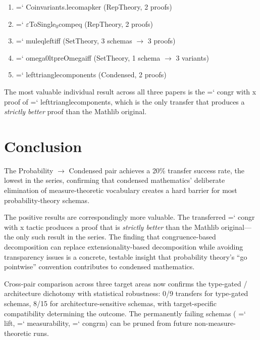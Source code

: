 \documentclass[11pt]{article}
\renewcommand{\texttt}[1]{%
  \begingroup\ttfamily\hyphenchar\font=`\-\relax
  \def\_{\textunderscore\discretionary{}{}{}}%
  #1\endgroup}
\theoremstyle{definition}
\theoremstyle{remark}
\begin{document}
\begin{enumerate}
\item \texttt{Coinvariants.le\_comap\_ker} (RepTheory, 2 proofs)
\item \texttt{$\varepsilon$ToSingle$_0$\_comp\_eq} (RepTheory, 2 proofs)
\item \texttt{mul\_eq\_left\_iff} (SetTheory, 3 schemas $\to$ 3 proofs)
\item \texttt{omega0\_lt\_preOmega\_iff} (SetTheory, 1 schema $\to$ 3 variants)
\item \texttt{left\_triangle\_components} (Condensed, 2 proofs)
\end{enumerate}

The most valuable individual result across all three papers is
the \texttt{congr with x} proof of
\texttt{left\_triangle\_components}, which is the only transfer
that produces a \emph{strictly better} proof than the Mathlib
original.

\section{Conclusion}\label{sec:conclusion}

The Probability $\to$ Condensed pair achieves a 20\% transfer
success rate, the lowest in the series, confirming that condensed
mathematics' deliberate elimination of measure-theoretic vocabulary
creates a hard barrier for most probability-theory schemas.

The positive results are correspondingly more valuable.  The
transferred \texttt{congr with x} tactic produces a proof that is
\emph{strictly better} than the Mathlib original---the only such
result in the series.  The finding that congruence-based
decomposition can replace extensionality-based decomposition
while avoiding transparency issues is a concrete, testable
insight that probability theory's ``go pointwise'' convention
contributes to condensed mathematics.

Cross-pair comparison across three target areas now confirms
the type-gated / architecture dichotomy with statistical
robustness: 0/9 transfers for type-gated schemas, 8/15 for
architecture-sensitive schemas, with target-specific compatibility
determining the outcome.  The permanently failing schemas
(\texttt{lift}, \texttt{measurability}, \texttt{congrm}) can be
pruned from future non-measure-theoretic runs.
\end{document}
